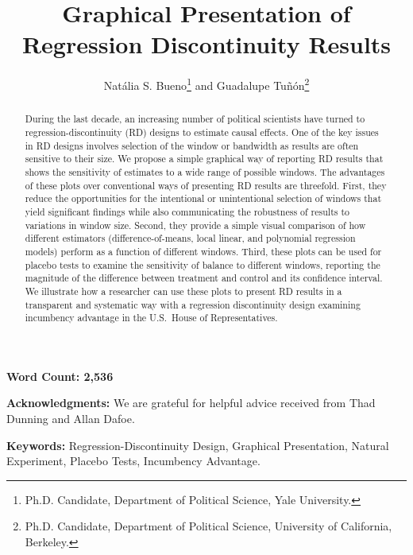 \documentclass[letterpaper,twoside,12pt]{article}
\providecommand{\keywords}[1]{\textbf{Keywords:} #1}
\begin{document}
\title{Graphical Presentation of Regression Discontinuity Results}
\date{}
\author{Nat\'{a}lia S. Bueno\footnote{Ph.D. Candidate, Department of Political Science, Yale University.} \hspace{1 mm} and Guadalupe Tu\~n\'on\footnote{Ph.D. Candidate, Department of Political Science, University of California, Berkeley.}}

\maketitle

\begin{center}
\textbf{Word Count: 2,536}
\end{center}

\vspace{50mm}
\noindent \textbf{Acknowledgments:} We are grateful for helpful advice received from Thad Dunning and Allan Dafoe.


\clearpage
\begin{abstract}
\noindent During the last decade, an increasing number of political scientists have turned to regression-discontinuity (RD) designs to estimate causal effects. One of the key issues in RD designs involves selection of the window or bandwidth as results are often sensitive to their size. We propose a simple graphical way of reporting RD results that shows the sensitivity of estimates to a wide range of possible windows. The advantages of these plots over conventional ways of presenting RD results are threefold. First, they reduce the opportunities for the intentional or unintentional selection of windows that yield significant findings while also communicating the robustness of results to variations in window size. Second, they provide a simple visual comparison of how different estimators (difference-of-means, local linear, and polynomial regression models) perform as a function of different windows. Third, these plots can be used for placebo tests to examine the sensitivity of balance to different windows, reporting the magnitude of the difference between treatment and control and its confidence interval. We illustrate how a researcher can use these plots to present RD results in a transparent and systematic way with a regression discontinuity design examining incumbency advantage in the U.S.\ House of Representatives.
\end{abstract}

\vspace*{10pt}
\noindent \keywords{Regression-Discontinuity Design, Graphical Presentation, Natural Experiment, Placebo Tests, Incumbency Advantage.}
\end{document}
